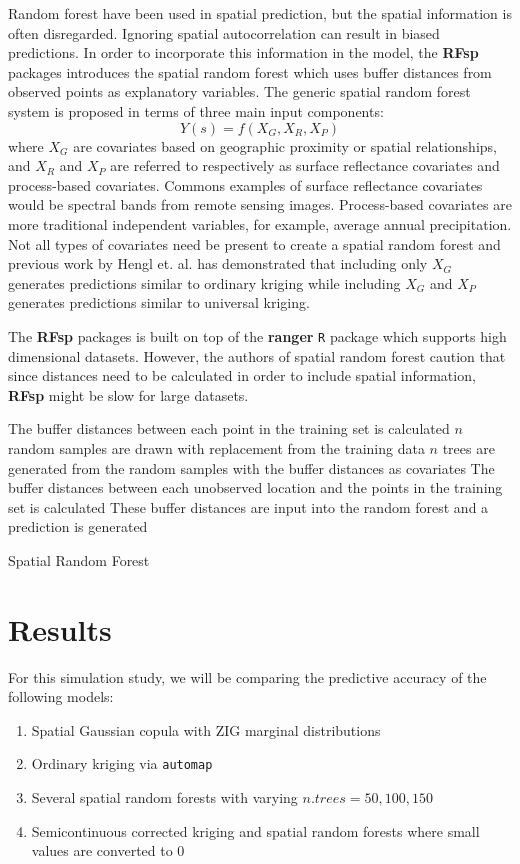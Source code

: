 \documentclass{article}
\begin{document}
Random forest have been used in spatial prediction, but the spatial information is often disregarded\cite{hengl18}.
Ignoring spatial autocorrelation can result in biased predictions.
In order to incorporate this information in the model, the \textbf{RFsp} packages introduces the spatial random forest which uses buffer distances from observed points as explanatory variables.
The generic spatial random forest system is proposed in terms of three main input components:
$$
Y(s) = f(X_G, X_R, X_P)
$$
where $X_G$ are covariates based on geographic proximity or spatial relationships, and $X_R$ and $X_P$ are referred to respectively as surface reflectance covariates and process-based covariates.
Commons examples of surface reflectance covariates would be spectral bands from remote sensing images.
Process-based covariates are more traditional independent variables, for example, average annual precipitation.
Not all types of covariates need be present to create a spatial random forest and previous work by Hengl et. al. has demonstrated that including only $X_G$ generates predictions similar to ordinary kriging while including $X_G$ and $X_P$ generates predictions similar to universal kriging\cite{hengl18}.

The \textbf{RFsp} packages is built on top of the \textbf{ranger} \texttt{R} package which supports high dimensional datasets.
However, the authors of spatial random forest caution that since distances need to be calculated in order to include spatial information, \textbf{RFsp} might be slow for large datasets.

\vspace{.5cm}

\begin{algorithm}[H]
\SetAlgoLined
{}
 {
	The buffer distances between each point in the training set is calculated\; 
	$n$ random samples are drawn with replacement from the training data\;
	$n$ trees are generated from the random samples with the buffer distances as covariates\;
	The buffer distances between each unobserved location and the points in the training set is calculated\; 
	These buffer distances are input into the random forest and a prediction is generated\; 
}
	\caption{Spatial Random Forest}
\end{algorithm}

\section{Results}
For this simulation study, we will be comparing the predictive accuracy of the following models: \begin{enumerate}
	\item Spatial Gaussian copula with ZIG marginal distributions
	\item Ordinary kriging via \texttt{automap}
	\item Several spatial random forests with varying $n.trees = 50, 100, 150$
	\item Semicontinuous corrected kriging and spatial random forests where small values are converted to 0
\end{enumerate}
\end{document}
